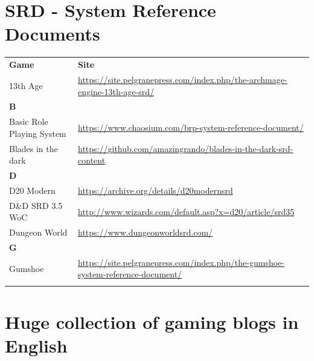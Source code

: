 \documentclass[a4paper, 11pt, twoside]{article}
\begin{document}
\section{SRD - System Reference Documents}
\label{sec:org833734b}

\begin{longtable}{lp{10cm}}
\textbf{Game} & \textbf{Site}\\
13th Age & \url{https://site.pelgranepress.com/index.php/the-archmage-engine-13th-age-srd/}\\
\textbf{B} & \\
Basic Role Playing System & \url{https://www.chaosium.com/brp-system-reference-document/}\\
Blades in the dark & \url{https://github.com/amazingrando/blades-in-the-dark-srd-content}\\
\textbf{D} & \\
D20 Modern & \url{https://archive.org/details/d20modernsrd}\\
D\&D SRD 3.5 WoC & \url{http://www.wizards.com/default.asp?x=d20/article/srd35}\\
Dungeon World & \url{https://www.dungeonworldsrd.com/}\\
\textbf{G} & \\
Gumshoe & \url{https://site.pelgranepress.com/index.php/the-gumshoe-system-reference-document/}\\
 & \\
\end{longtable}

\section{Huge collection of gaming blogs in English}
\label{sec:org029d9da}
\end{document}
